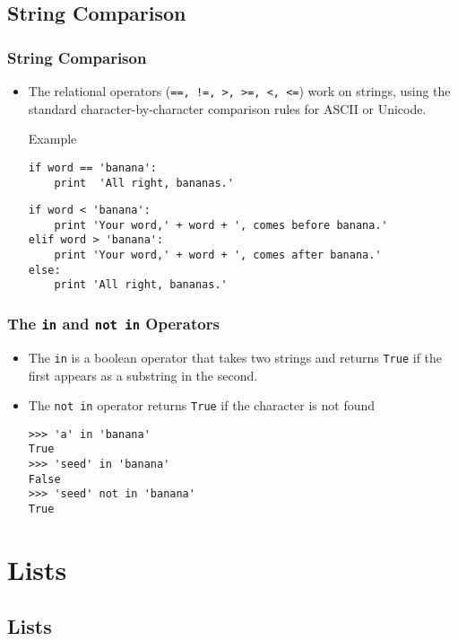 \documentclass{beamer}
\newcommand{\beforeverb}{\footnotesize}
\newcommand{\afterverb}{\normalsize}
\begin{document}
\subsection[String Comparison]{String Comparison}
\begin{frame}[fragile]
\frametitle{String Comparison}
\begin{itemize}
\item The relational operators ({\tt ==, !=, >, >=, <, <=}) work on strings, using the standard character-by-character comparison rules for ASCII or Unicode.
\begin{block}{Example}
\beforeverb
\begin{verbatim}
if word == 'banana':
    print  'All right, bananas.'
\end{verbatim}
\begin{verbatim}
if word < 'banana':
    print 'Your word,' + word + ', comes before banana.'
elif word > 'banana':
    print 'Your word,' + word + ', comes after banana.'
else:
    print 'All right, bananas.'
\end{verbatim}


\end{block}
\end{itemize}
\end{frame}

\begin{frame}[fragile]
\frametitle{The {\tt in} and {\tt not in} Operators}
\begin{itemize}
\item The {\tt in} is a \alert{ boolean operator} that takes two strings and
returns {\tt True} if the first appears as a substring in the second.
\item The {\tt not in} operator returns {\tt True} if the character is not found
\begin{block}{}
\beforeverb
\begin{verbatim}
>>> 'a' in 'banana'
True
>>> 'seed' in 'banana'
False
>>> 'seed' not in 'banana'
True
\end{verbatim}
\afterverb
\end{block}
\end{itemize}
\end{frame}
\section{Lists}
\subsection[Lists]{Lists}
\end{document}

